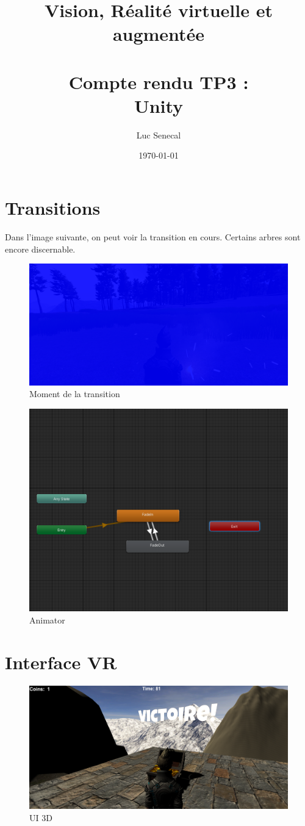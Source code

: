 \documentclass[12pt, french]{article}
\title{\Huge{ Vision, Réalité virtuelle et augmentée\\~\\Compte rendu TP3 : \\Unity}}
\author{Luc Senecal}
\date{\today}
\begin{document}
\maketitle
\newpage

\section{Transitions}

Dans l'image suivante, on peut voir la transition en cours. Certains arbres sont encore discernable.

\begin{figure}[h]
\centering
\includegraphics[width = \linewidth]{transition}
\caption{Moment de la transition}
\end{figure}

\begin{figure}[h]
\centering
\includegraphics[width = 0.6\linewidth]{animator}
\caption{Animator}
\end{figure}

\clearpage
\section{Interface VR}

\begin{figure}[h]
\centering
\includegraphics[width = \linewidth]{interface}
\caption{UI 3D}
\end{figure}
\end{document}
